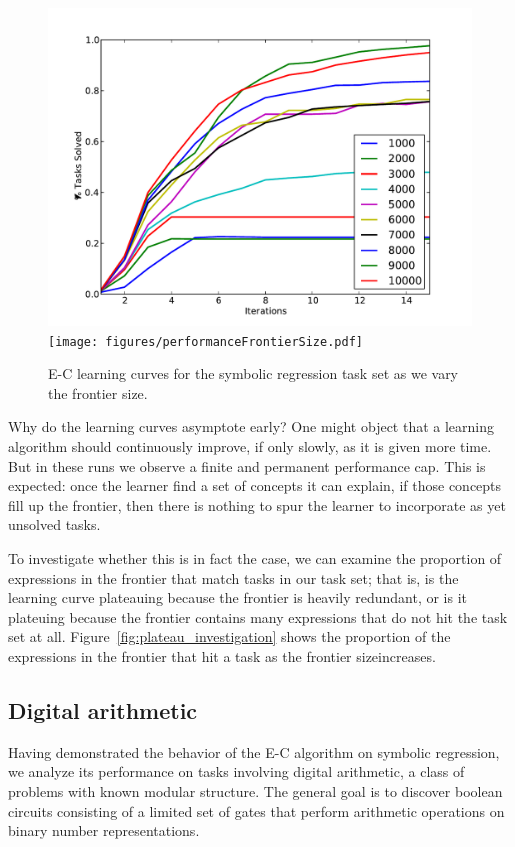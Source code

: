\documentclass{article}
\begin{document}
\begin{figure}

\includegraphics[width=\linewidth]{figures/learningCurves.pdf}
\texttt{[image: figures/performanceFrontierSize.pdf]}
\caption{E-C learning curves for the symbolic regression task set as
  we vary the frontier size.}
\label{fig:symreg} 
\end{figure}


Why do the learning curves asymptote early? One might object that a
learning algorithm should continuously improve, if only slowly, as it
is given more time. But in these runs we observe a finite and
permanent performance cap. This is expected: once the learner find a
set of concepts it can explain, if those concepts fill up the
frontier, then there is nothing to spur the learner to incorporate as
yet unsolved tasks. 

To investigate whether this is in fact the case, we can examine the
proportion of expressions in the frontier that match tasks in our task
set; that is, is the learning curve plateauing because the frontier is
heavily redundant, or is it plateuing because the frontier contains
many expressions that do not hit the task set at
all. Figure~\ref{fig:plateau_investigation} shows the proportion of
the expressions in the frontier that hit a task as the frontier sizeincreases.


\subsection{Digital arithmetic}
Having demonstrated the behavior of the E-C algorithm on symbolic
regression, we analyze its performance on tasks involving digital
arithmetic, a class of problems with known modular structure. The
general goal is to discover boolean circuits consisting of a limited
set of gates that perform arithmetic operations on binary number
representations. 




\nocite{*}
\end{document}
